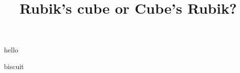 \documentclass{article}
\title{Rubik's cube or Cube's Rubik?}
\begin{document}
    hello

    biscuit
\end{document}
